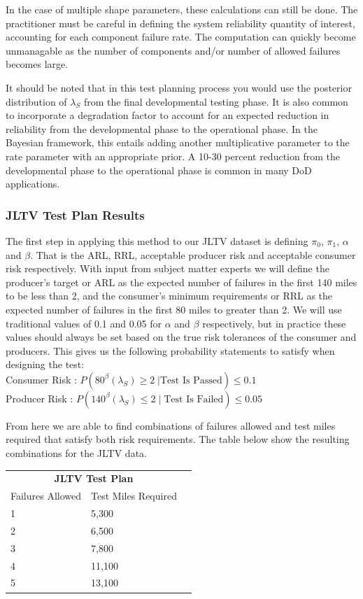 \documentclass[12pt]{article}
\begin{document}
In the case of multiple shape parameters, these calculations can still be done.
The practitioner must be careful in defining the system reliability quantity of
interest, accounting for each component failure rate.  The computation can
quickly become  unmanagable as the number of components and/or number of allowed
failures becomes large.

It should be noted that in this test planning process you would use the
posterior distribution of $\lambda_S$ from the final developmental testing
phase.  It is also common to incorporate a degradation factor to account for an
expected reduction in reliability from the developmental phase to the
operational phase.  In the Bayesian framework, this entails adding another
multiplicative parameter to the rate parameter with an appropriate prior.   A
10-30 percent reduction from the developmental phase to the operational phase is
common in many DoD applications.

\subsubsection{JLTV Test Plan Results}
The first step in applying this method to our JLTV dataset is defining $\pi_0$,
$\pi_1$, $\alpha$ and $\beta$.  That is the ARL, RRL, acceptable producer risk
and acceptable consumer risk respectively.  With input from subject matter
experts  we will define the producer's target or ARL as the expected number of
failures in the first 140 miles to be less  than 2, and the consumer's minimum
requirements or RRL as the expected number of failures in  the first 80 miles to
greater than 2.  We will use traditional values of 0.1 and 0.05 for $\alpha$ and
$\beta$ respectively, but in practice these values should always be set based on
the true risk tolerances of the consumer and producers.  This gives us the
following probability statements to satisfy when designing the test:
\\
Consumer Risk : $ P(80^\beta (\lambda_S) \geq 2 \; \vert \text{Test Is Passed}) \leq 0.1 $ \\
Producer Risk : $ P(140^\beta (\lambda_S) \leq 2 \; \vert \; \text{Test Is Failed}) \leq 0.05 $

From here we are able to find combinations of failures allowed and test miles
required that satisfy both risk requirements.  The table below show the
resulting combinations for the JLTV data.

\begin{tabular}{|l|l|r|}
\multicolumn{2}{c}{\textbf{JLTV Test Plan}} \\
\cline{1-2}
Failures Allowed    & Test Miles Required \\
\hline
1   & 5,300      \\
2   & 6,500      \\
3   & 7,800      \\
4   & 11,100     \\
5   & 13,100     \\
\hline
\end{tabular}
\end{document}
